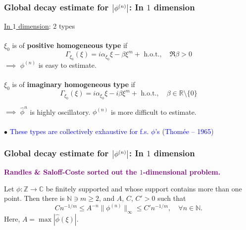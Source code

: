 \documentclass{beamer}
\theoremstyle{definition}
\begin{document}
\begin{frame}
\frametitle{Global decay estimate for $\abs{\phi^{(n)}}$: In $1$ dimension}

\underline{In $1$ dimension}: 2 types\\
$\,$\\

$\xi_0$ is of \textbf{positive homogeneous type} if
\begin{equation*}
\Gamma_{\xi_0}(\xi) = i\alpha_{\xi_0} \xi- \beta \xi^m + \text{ h.o.t.}, \quad \Re{\beta} >0
\end{equation*}
$\implies$ $\phi^{(n)}$ is easy to estimate.\\
$\,$\\


\pause
$\xi_0$ is of \textbf{imaginary homogeneous type} if
\begin{equation*}
\Gamma_{\xi_0}(\xi) = i\alpha_{\xi_0} \xi - i\beta\xi^m   + \text{ h.o.t.},  \quad \beta\in \mathbb{R}\setminus\{0\}
\end{equation*}

$\implies$ $\widehat{\phi}^n$ is highly oscillatory. $\phi^{(n)}$ is more difficult to estimate.\\
$\,$\\
$\bullet$ \textcolor{blue}{These types are collectively exhaustive for f.s. $\phi$'s (Thom\'{e}e -- 1965)}
\end{frame}




\begin{frame}
\frametitle{Global decay estimate for $\abs{\phi^{(n)}}$: In $1$ dimension}




\begin{center}
	\textbf{\textcolor{purple}{Randles \& Saloff-Coste sorted out the $1$-dimensional problem. }  }
\end{center}


\begin{theorem}
	Let $\phi : \mathbb{Z} \to \mathbb{C}$ be finitely supported and whose support contains more than one point. Then there is $\mathbb{N} \ni m \geq 2$, and $A$, $C$, $C' > 0$ such that 
	\begin{equation*}
	Cn^{-1/m} \leq A^{-n}\| \phi^{(n)} \|_\infty \leq C' n^{-1/m}, \quad \forall n\in \mathbb{N}.
	\end{equation*}
	Here, $A=\max|\widehat{\phi}(\xi)|$.
\end{theorem}


\end{frame}
\end{document}
